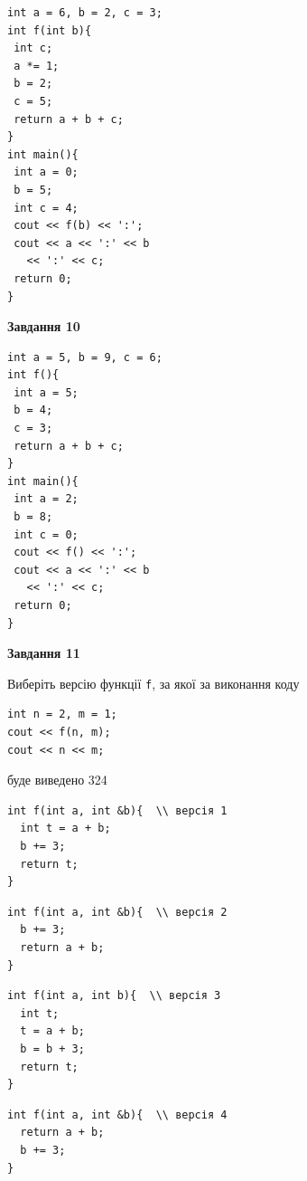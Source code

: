 \documentclass[12pt, ukrainian]{article}
\def\code#1{\Verb!#1!}
\begin{document}
{\begin {large}
\begin{minipage}[t]{7.0cm}
\begin{verbatim}
int a = 6, b = 2, c = 3;
int f(int b){
 int c;
 a *= 1;
 b = 2;
 c = 5;
 return a + b + c;
}
int main(){
 int a = 0;
 b = 5;
 int c = 4;
 cout << f(b) << ':';
 cout << a << ':' << b 
   << ':' << c;
 return 0;
}
\end{verbatim}



\begin{center}
\textbf{Завдання 10}
\end{center}
\vspace{-8mm}

\begin{verbatim}
int a = 5, b = 9, c = 6;
int f(){
 int a = 5;
 b = 4;
 c = 3;
 return a + b + c;
}
int main(){
 int a = 2;
 b = 8;
 int c = 0;
 cout << f() << ':';
 cout << a << ':' << b 
   << ':' << c;
 return 0;
}
\end{verbatim}

\end{minipage}
\vline \hspace{1mm}
\begin{minipage}[t]{11.0cm}

\begin{center}
\textbf{Завдання 11}
\end{center}
Виберіть версію функції \code{f}, за якої за виконання коду
\begin{verbatim}
int n = 2, m = 1;
cout << f(n, m);
cout << n << m;
\end{verbatim}

буде виведено 324

\begin{verbatim}
int f(int a, int &b){  \\ версія 1
  int t = a + b;
  b += 3;
  return t;
}
\end{verbatim}

\vspace{-8mm}\begin{verbatim}
int f(int a, int &b){  \\ версія 2
  b += 3;
  return a + b;
}
\end{verbatim}

\vspace{-8mm}\begin{verbatim}
int f(int a, int b){  \\ версія 3
  int t;
  t = a + b;
  b = b + 3;
  return t;
}
\end{verbatim}

\vspace{-8mm}\begin{verbatim}
int f(int a, int &b){  \\ версія 4
  return a + b;
  b += 3;
}
\end{verbatim}




\end{minipage}
\end{large}}
\end{document}
